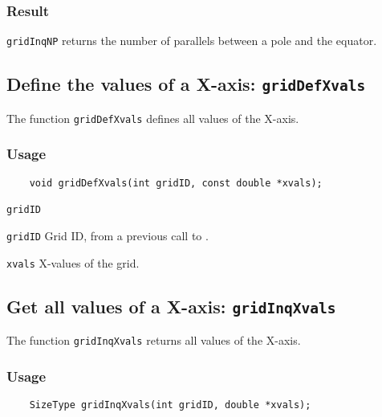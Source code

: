 \subsubsection*{Result}

{\texttt{gridInqNP}} returns the number of parallels between a pole and the equator.



\subsection{Define the values of a X-axis: \texttt{gridDefXvals}}
\label{gridDefXvals}

The function {\texttt{gridDefXvals}} defines all values of the X-axis.

\subsubsection*{Usage}

\begin{verbatim}
    void gridDefXvals(int gridID, const double *xvals);
\end{verbatim}

\hspace*{4mm}\begin{minipage}[]{15cm}
\begin{deflist}{\texttt{gridID}\ }
\item[\texttt{gridID}]
Grid ID, from a previous call to {}.
\item[\texttt{xvals}]
X-values of the grid.

\end{deflist}
\end{minipage}


\subsection{Get all values of a X-axis: \texttt{gridInqXvals}}
\label{gridInqXvals}

The function {\texttt{gridInqXvals}} returns all values of the X-axis.

\subsubsection*{Usage}

\begin{verbatim}
    SizeType gridInqXvals(int gridID, double *xvals);
\end{verbatim}

